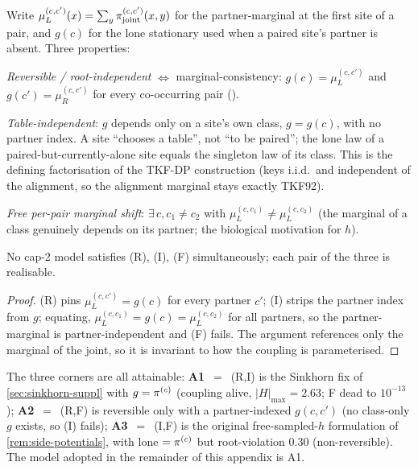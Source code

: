 Write $\mu_L^{(c,c')}(x)=\sum_y\pi_{\mathrm{joint}}^{(c,c')}(x,y)$ for the
partner-marginal at the first site of a pair, and $g(c)$ for the
lone stationary used when a paired site's partner is absent. Three
properties:
\begin{description}[leftmargin=2.2em]
  \item[(R)] \emph{Reversible / root-independent} $\Leftrightarrow$
    marginal-consistency: $g(c)=\mu_L^{(c,c')}$ and
    $g(c')=\mu_R^{(c,c')}$ for every co-occurring pair
    ().
  \item[(I)] \emph{Table-independent}: $g$ depends only on a site's
    own class, $g=g(c)$, with no partner index. A site ``chooses a
    table'', not ``to be paired''; the lone law of a
    paired-but-currently-alone site equals the singleton law of its
    class. This is the defining factorisation of the TKF-DP
    construction (keys i.i.d.\ and independent of the alignment, so
    the alignment marginal stays exactly TKF92).
  \item[(F)] \emph{Free per-pair marginal shift}: $\exists\,c,c_1\neq c_2$
    with $\mu_L^{(c,c_1)}\neq\mu_L^{(c,c_2)}$ (the marginal of a
    class genuinely depends on its partner; the biological motivation
    for $h$).
\end{description}

\begin{theorem}
\label{thm:triangle}
No cap-2 model satisfies (R), (I), (F) simultaneously; each pair of
the three is realisable.
\end{theorem}

\begin{proof}
(R) pins $\mu_L^{(c,c')}=g(c)$ for every partner $c'$; (I) strips
the partner index from $g$; equating,
$\mu_L^{(c,c_1)}=g(c)=\mu_L^{(c,c_2)}$ for all partners, so the
partner-marginal is partner-independent and (F) fails. The argument
references only the marginal of the joint, so it is invariant to
how the coupling is parameterised.
\end{proof}

The three corners are all attainable: \textbf{A1}~$=$~(R,I) is the
Sinkhorn fix of \autoref{sec:sinkhorn-suppl} with $g=\pi^{(c)}$
(coupling alive, $|H|_{\max}=2.63$; F dead to $10^{-13}$);
\textbf{A2}~$=$~(R,F) is reversible only with a partner-indexed
$g(c,c')$ (no class-only $g$ exists, so (I) fails);
\textbf{A3}~$=$~(I,F) is the original free-sampled-$h$ formulation
of \autoref{rem:side-potentials}, with lone $=\pi^{(c)}$ but
root-violation $0.30$ (non-reversible). The model adopted in the
remainder of this appendix is A1.

